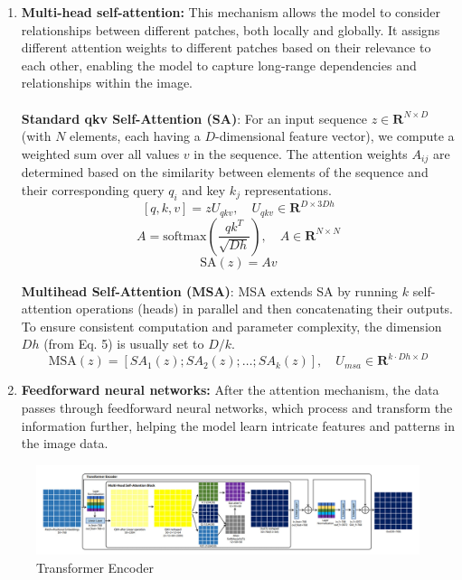 \begin{enumerate}
    \item \textbf{Multi-head self-attention:} This mechanism allows the model to consider relationships between different patches, both locally and globally. It assigns different attention weights to different patches based on their relevance to each other, enabling the model to capture long-range dependencies and relationships within the image. \\
          \\
          \noindent \textbf{Standard qkv Self-Attention (SA)}:
          For an input sequence $z \in \mathbf{R}^{N \times D}$ (with $N$ elements, each having a $D$-dimensional feature vector), we compute a weighted sum over all values $v$ in the sequence. The attention weights $A_{ij}$ are determined based on the similarity between elements of the sequence and their corresponding query $q_i$ and key $k_j$ representations.
          \[
              [q, k, v] = zU_{qkv}, \quad U_{qkv} \in \mathbf{R}^{D \times 3Dh}
          \]
          \[
              A = \text{softmax}\left(\frac{qk^T}{\sqrt{Dh}}\right), \quad A \in \mathbf{R}^{N \times N}
          \]
          \[
              \text{SA}(z) = Av
          \]

          \textbf{Multihead Self-Attention (MSA)}:
          MSA extends SA by running $k$ self-attention operations (heads) in parallel and then concatenating their outputs. To ensure consistent computation and parameter complexity, the dimension $Dh$ (from Eq. 5) is usually set to $D/k$.
          \[
              \text{MSA}(z) = [SA_1(z); SA_2(z); \ldots ; SA_k(z)], \quad U_{msa} \in \mathbf{R}^{k \cdot Dh \times D}
          \]

    \item \textbf{Feedforward neural networks:} After the attention mechanism, the data passes through feedforward neural networks, which process and transform the information further, helping the model learn intricate features and patterns in the image data.
\end{enumerate}

\begin{figure}[htbp]
    \centering
    \includegraphics[width=6in]{img/encoderdetails.jpg}
    \caption{Transformer Encoder}
\end{figure}

